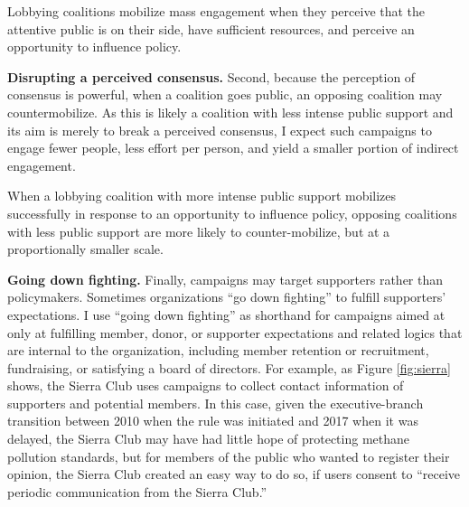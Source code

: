 \begin{subhyp}

\begin{hyp}
Lobbying coalitions mobilize mass engagement when they perceive that the attentive public is on their side, have sufficient resources, and perceive an opportunity to influence policy.
\end{hyp}

\textbf{Disrupting a perceived consensus.} Second, because the perception of consensus is powerful, when a coalition goes public, an opposing coalition may countermobilize. As this is likely a coalition with less intense public support and its aim is merely to break a perceived consensus, I expect such campaigns to engage fewer people, less effort per person, and yield a smaller portion of indirect engagement.


\begin{hyp}
When a lobbying coalition with more intense public support mobilizes successfully in response to an opportunity to influence policy, opposing coalitions with less public support are more likely to counter-mobilize, but at a proportionally smaller scale.
\end{hyp}

\textbf{Going down fighting.} Finally, campaigns may target supporters rather than policymakers. Sometimes organizations ``go down fighting'' to fulfill supporters' expectations.
I use ``going down fighting'' as shorthand for campaigns aimed at only at fulfilling member, donor, or supporter expectations and related logics that are internal to the organization, including member retention or recruitment, fundraising, or satisfying a board of directors. For example, as Figure \ref{fig:sierra} shows, the Sierra Club uses campaigns to collect contact information of supporters and potential members. In this case, given the executive-branch transition between 2010 when the rule was initiated and 2017 when it was delayed, the Sierra Club may have had little hope of protecting methane pollution standards, but for members of the public who wanted to register their opinion, the Sierra Club created an easy way to do so, if users consent to ``receive periodic communication from the Sierra Club.'' 


\end{subhyp}
